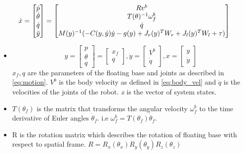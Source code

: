 \begin{equation}
\label{eq:toro}
	\dot{x} = 
	\begin{bmatrix}
	\dot{p} \\ \dot{\theta} \\ \dot{q} \\ \ddot{y}
	\end{bmatrix}
	=
	\begin{bmatrix}
	R v^b\\	
	T(\theta)^{-1} \omega_f^b \\
	\dot{q}\\
	M(y)^{-1}(-C(y,\dot{y})\dot{y} -g(y) +  J_r(y)^{T}W_{r} +J_l(y)^{T}W_{l} + \tau)	
	\end{bmatrix}
	\\
	\end{equation}
	

\begin{itemize}
\item $$ y = \begin{bmatrix} p \\ \theta \\ q \end{bmatrix} = \begin{bmatrix} x_f \\ q \end{bmatrix}, \dot{y} = \begin{bmatrix} V^b \\ \dot{q}\end{bmatrix}, x = \begin{bmatrix}y \\ \dot{y}\end{bmatrix} $$  $x_f,q$ are the parameters of the floating base and joints as described in \ref{eq:motion}. $V^b$ is the body velocity as defined in \ref{eq:body_vel} and $\dot{q}$ is the velocities of the joints of the robot. \emph{x} is the vector of system states.
\item $T(\theta_{f})$ is the matrix that transforms the angular velocity $\omega_{f}^{b}$ to the time derivative of Euler angles $\dot{\theta}_{f}$. i.e $\omega_{f}^{b}=T(\theta_{f}) \dot{\theta}_{f}$. 
\item R is the rotation matrix which describes the rotation of floating base with respect to spatial frame. $ R = R_x(\theta_x) R_y(\theta_y) R_z(\theta_z)$
\end{itemize}

